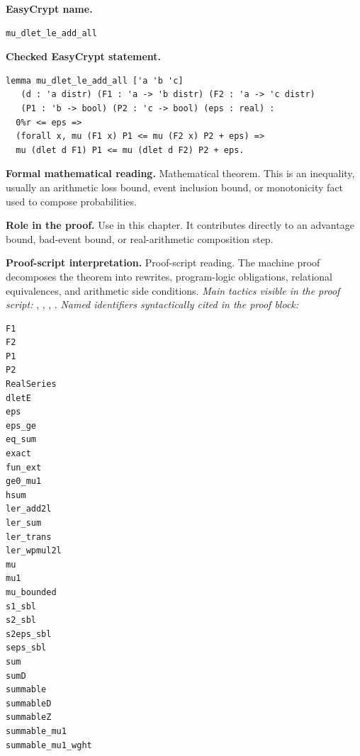 \begin{formaltheorem}
\noindent\textbf{EasyCrypt name.}
\begin{lstlisting}[language=EasyCrypt,basicstyle=\ttfamily\scriptsize]
mu_dlet_le_add_all
\end{lstlisting}
\noindent\textbf{Checked EasyCrypt statement.}
\begin{lstlisting}[language=EasyCrypt,basicstyle=\ttfamily\scriptsize]
lemma mu_dlet_le_add_all ['a 'b 'c]
   (d : 'a distr) (F1 : 'a -> 'b distr) (F2 : 'a -> 'c distr)
   (P1 : 'b -> bool) (P2 : 'c -> bool) (eps : real) :
  0%r <= eps =>
  (forall x, mu (F1 x) P1 <= mu (F2 x) P2 + eps) =>
  mu (dlet d F1) P1 <= mu (dlet d F2) P2 + eps.
\end{lstlisting}
\noindent\textbf{Formal mathematical reading.}
Mathematical theorem. This is an inequality, usually an arithmetic loss bound, event inclusion bound, or monotonicity fact used to compose probabilities.

\noindent\textbf{Role in the proof.}
Use in this chapter. It contributes directly to an advantage bound, bad-event bound, or real-arithmetic composition step.

\noindent\textbf{Proof-script interpretation.}
Proof-script reading. The machine proof decomposes the theorem into rewrites, program-logic obligations, relational equivalences, and arithmetic side conditions.
\emph{Main tactics visible in the proof script:} , , , .
\emph{Named identifiers syntactically cited in the proof block:}
\begin{lstlisting}[language=EasyCrypt,basicstyle=\ttfamily\scriptsize]
F1
F2
P1
P2
RealSeries
dletE
eps
eps_ge
eq_sum
exact
fun_ext
ge0_mu1
hsum
ler_add2l
ler_sum
ler_trans
ler_wpmul2l
mu
mu1
mu_bounded
s1_sbl
s2_sbl
s2eps_sbl
seps_sbl
sum
sumD
summable
summableD
summableZ
summable_mu1
summable_mu1_wght
\end{lstlisting}

\end{formaltheorem}

